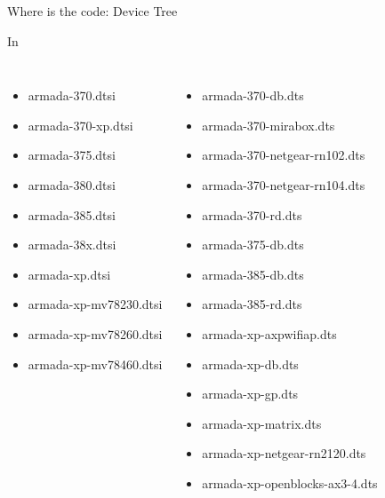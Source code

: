 \begin{frame}{Where is the code: Device Tree}

In 
\footnotesize
\begin{columns}
\begin{itemize}
\item armada-370.dtsi
\item armada-370-xp.dtsi
\item armada-375.dtsi
\item armada-380.dtsi
\item armada-385.dtsi
\item armada-38x.dtsi
\item armada-xp.dtsi
\item armada-xp-mv78230.dtsi
\item armada-xp-mv78260.dtsi
\item armada-xp-mv78460.dtsi
\end{itemize}
\begin{itemize}
\item armada-370-db.dts
\item armada-370-mirabox.dts
\item armada-370-netgear-rn102.dts
\item armada-370-netgear-rn104.dts
\item armada-370-rd.dts
\item armada-375-db.dts
\item armada-385-db.dts
\item armada-385-rd.dts
\item armada-xp-axpwifiap.dts
\item armada-xp-db.dts
\item armada-xp-gp.dts
\item armada-xp-matrix.dts
\item armada-xp-netgear-rn2120.dts
\item armada-xp-openblocks-ax3-4.dts
\end{itemize}
\end{columns}

\end{frame}

